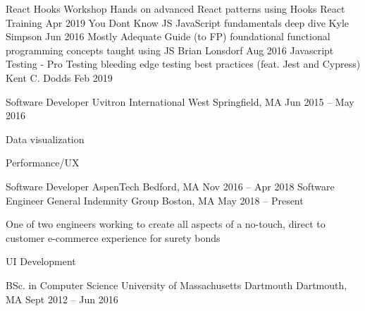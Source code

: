 \documentclass[]{awesome-cv}
\begin{document}
\vspace{-7mm}
\begin{cvhonors}
	\cvhonor
	{React Hooks Workshop}
	{Hands on advanced React patterns using Hooks}
	{React Training}
	{Apr 2019}
	\cvhonor
	{You Don\textquotesingle{}t Know JS}
	{JavaScript fundamentals deep dive}
	{Kyle Simpson}
	{Jun 2016}
	\cvhonor
	{Mostly Adequate Guide (to FP)}
	{foundational functional programming concepts taught using JS}
	{Brian Lonsdorf}
	{Aug 2016}
	\cvhonor
	{Javascript Testing - Pro Testing}
	{bleeding edge testing best practices (feat. Jest and Cypress)}
	{Kent C. Dodds}
	{Feb 2019}
\end{cvhonors}
\begin{cventries}
	\cventry
	{Software Developer}
	{Uvitron International}
	{West Springfield, MA}
	{Jun 2015 – May 2016}
	{\begin{cvitems}
		\item {Data visualization}
		\item {Performance/UX}
		\end{cvitems}}
	\cventry
	{Software Developer}
	{AspenTech}
	{Bedford, MA}
	{Nov 2016 – Apr 2018}
	{}
	\cventry
	{Software Engineer}
	{General Indemnity Group}
	{Boston, MA}
	{May 2018 – Present}
	{\begin{cvitems}
		\item {One of two engineers working to create all aspects of a no-touch, direct to customer e-commerce experience for surety bonds}
		\item {UI Development}
		\end{cvitems}}
\end{cventries}
\begin{cventries}
	\cventry
	{BSc. in Computer Science}
	{University of Massachusetts Dartmouth}
	{Dartmouth, MA}
	{Sept 2012 – Jun 2016}
	{}
\end{cventries}

\vspace{-2mm}
\ 
\end{document}
